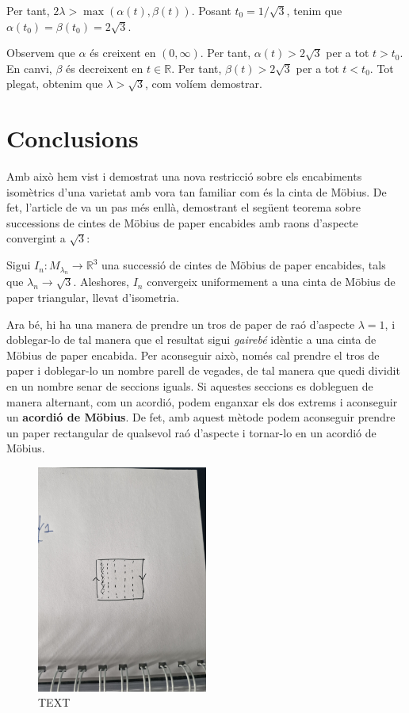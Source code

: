 Per tant, $2\lambda > \max(\alpha(t),\beta(t))$. Posant $t_0 = 1/\sqrt{3}$, tenim que $\alpha(t_0) = \beta(t_0) = 2\sqrt3$.

Observem que $\alpha$ és creixent en $(0,\infty)$. Per tant, $\alpha(t)>2\sqrt3$ per a tot $t>t_0$. En canvi, $\beta$ és decreixent en $t\in\mathbb R$. Per tant, $\beta(t)>2\sqrt3$ per a tot $t<t_0$. Tot plegat, obtenim que $\lambda>\sqrt3$, com volíem demostrar.

\section{Conclusions}
Amb això hem vist i demostrat una nova restricció sobre els encabiments isomètrics d'una varietat amb vora tan familiar com és la cinta de Möbius. De fet, l'article de \cite{schwartz2024} va un pas més enllà, demostrant el següent teorema sobre successions de cintes de Möbius de paper encabides amb raons d'aspecte convergint a $\sqrt{3}$:

\begin{teo}\label{teo:Límit triangular}
    Sigui $I_n:M_{\lambda_n}\to\mathbb R^3$ una successió de cintes de Möbius de paper encabides, tals que $\lambda_n\to\sqrt{3}$. Aleshores, $I_n$ convergeix uniformement a una cinta de Möbius de paper triangular, llevat d'isometria.
\end{teo}

Ara bé, hi ha una manera de prendre un tros de paper de raó d'aspecte $\lambda = 1$, i doblegar-lo de tal manera que el resultat sigui \textit{gairebé} idèntic a una cinta de Möbius de paper encabida. Per aconseguir això, només cal prendre el tros de paper i doblegar-lo un nombre parell de vegades, de tal manera que quedi dividit en un nombre senar de seccions iguals. Si aquestes seccions es dobleguen de manera alternant, com un acordió, podem enganxar els dos extrems i aconseguir un \textbf{acordió de Möbius}. De fet, amb aquest mètode podem aconseguir prendre un paper rectangular de qualsevol raó d'aspecte i tornar-lo en un acordió de Möbius. 

\begin{figure}[htbp]
    \centering
    \includegraphics[width=0.5\textwidth]{Fotos/QUARTA.jpg}
    \caption{{\color{blue}TEXT}}
    \label{fig:acordio_mobius}
\end{figure}

